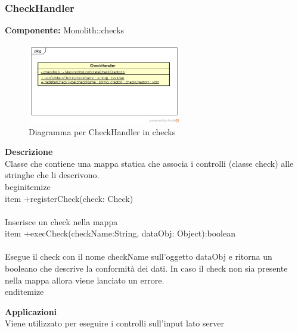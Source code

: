 \subsubsection{CheckHandler}
\textbf{Componente:}  Monolith::checks\\
   \FloatBarrier
   \begin{figure}[ht]
   \centering
   \includegraphics[width=0.6\textwidth]{img/single-CheckHandler}
   \caption{{Diagramma per CheckHandler in checks}}
\end{figure}
\FloatBarrier
\textbf{Descrizione}\\
Classe che contiene una mappa statica che associa i controlli (classe check) alle stringhe che li descrivono. 
\\begin{itemize}
\\item +registerCheck(check: Check) \\\\
Inserisce un check nella mappa
\\item +execCheck(checkName:String, dataObj: Object):boolean \\\\
Esegue il check con il nome checkName sull'oggetto dataObj e ritorna un booleano che descrive la conformità dei dati. In caso il check non sia presente nella mappa allora viene lanciato un errore.
\\end{itemize} 


\textbf{Applicazioni}\\
Viene utilizzato per eseguire i controlli sull'input lato server 


\clearpage

